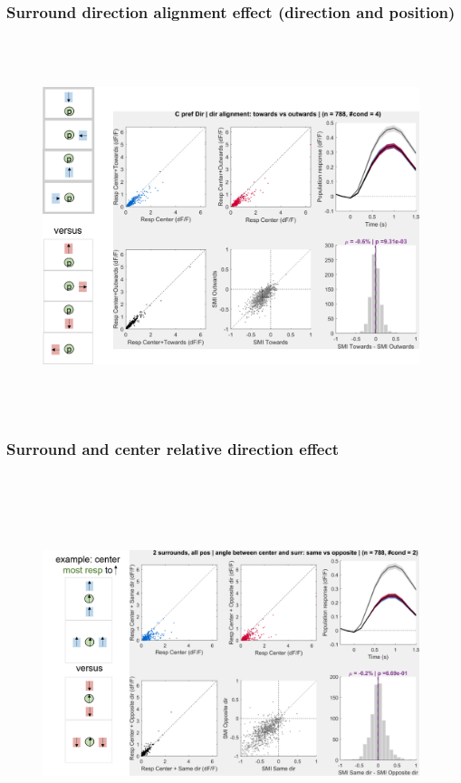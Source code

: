 \subsubsection{Surround direction alignment effect (direction and position)}

\begin{figure}[H] \centering \includegraphics[width=11cm,height=11cm,keepaspectratio]{Figures/7.Results/population/sel/diagrams/17.png} 
\end{figure}

\subsubsection{Surround and center relative direction effect}

\begin{figure}[H] \centering \includegraphics[width=11cm,height=11cm,keepaspectratio]{Figures/7.Results/population/sel/diagrams/18.png} 
\end{figure}

